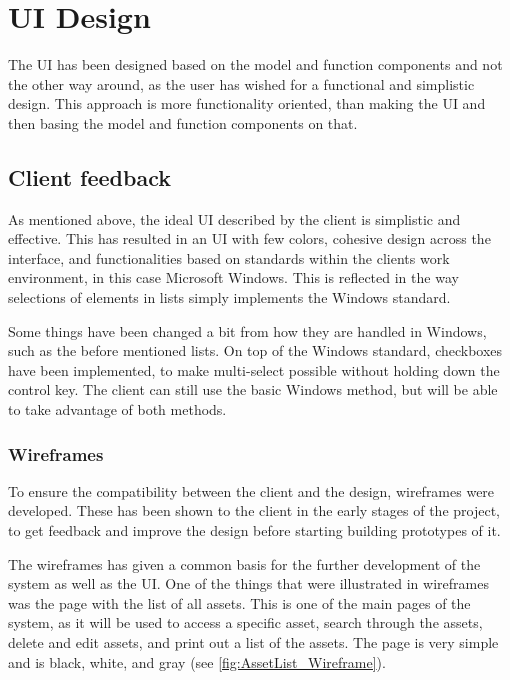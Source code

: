 \chapter{UI Design} \label{ch:ui_design}
The UI has been designed based on the model and function components and not the other way around, as the user has wished for a functional and simplistic design. This approach is more functionality oriented, than making the UI and then basing the model and function components on that.

\section{Client feedback}
As mentioned above, the ideal UI described by the client is simplistic and effective. This has resulted in an UI with few colors, cohesive design across the interface, and functionalities based on standards within the clients work environment, in this case Microsoft Windows. This is reflected in the way selections of elements in lists simply implements the Windows standard.
\par
Some things have been changed a bit from how they are handled in Windows, such as the before mentioned lists. On top of the Windows standard, checkboxes have been implemented, to make multi-select possible without holding down the control key. The client can still use the basic Windows method, but will be able to take advantage of both methods.

\subsection{Wireframes}
To ensure the compatibility between the client and the design, wireframes were developed. These has been shown to the client in the early stages of the project, to get feedback and improve the design before starting building prototypes of it.
\par
The wireframes has given a common basis for the further development of the system as well as the UI. One of the things that were illustrated in wireframes was the page with the list of all assets. This is one of the main pages of the system, as it will be used to access a specific asset, search through the assets, delete and edit assets, and print out a list of the assets. The page is very simple and is black, white, and gray (see \autoref{fig:AssetList_Wireframe}).

